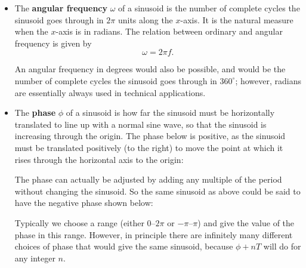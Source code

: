 \documentclass{article}
\begin{document}
\begin{itemize}
\item The \textbf{angular frequency} $\omega$ of a sinusoid is the number of complete cycles the sinusoid goes through in $2\pi$ units along the $x$-axis. It is the natural measure when the $x$-axis is in radians. The relation between ordinary and angular frequency is given by
\[\omega=2\pi f.\]

An angular frequency in degrees would also be possible, and would be the number of complete cycles the sinusoid goes through in $360^\circ$; however, radians are essentially always used in technical applications.

\item The \textbf{phase} $\phi$ of a sinusoid is how far the sinusoid must be horizontally translated to line up with a normal sine wave, so that the sinusoid is increasing through the origin. The phase below is positive, as the sinusoid must be translated positively (to the right) to move the point at which it rises through the horizontal axis to the origin:
	\begin{center}
	\end{center}

The phase can actually be adjusted by adding any multiple of the period without changing the sinusoid. So the same sinusoid as above could be said to have the negative phase shown below:
	\begin{center}
	\end{center}
	
	Typically we choose a range (either $0$--$2\pi$ or $-\pi$--$\pi$) and give the value of the phase in this range. However, in principle there are infinitely many different choices of phase that would give the same sinusoid, because $\phi+nT$ will do for any integer $n$.
\end{itemize}
\end{document}
